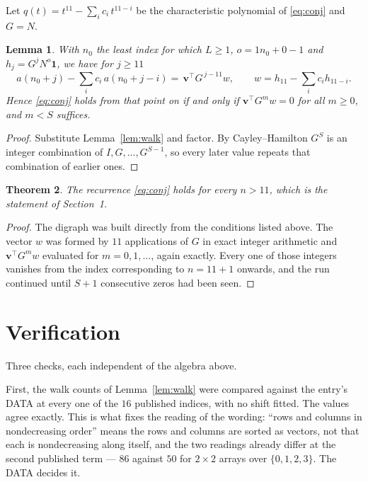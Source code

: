 \documentclass[11pt,a4paper]{article}
\theoremstyle{plain}
\newtheorem{theorem}{Theorem}
\newtheorem{lemma}[theorem]{Lemma}
\theoremstyle{definition}
\begin{document}
Let $q(t)=t^{11}-\sum_i c_i\,t^{11-i}$ be the characteristic polynomial of
\eqref{eq:conj} and $G=N$.

\begin{lemma}\label{lem:crit}
With $n_0$ the least index for which $L\ge1$, $o=1n_0+0-1$ and
$h_j=G^{j}N^{o}\mathbf{1}$, we have for $j\ge11$
\[
a(n_0+j)-\sum_i c_i\,a(n_0+j-i)=\,\mathbf{v}^{\!\top}G^{\,j-11}w,
\qquad w=h_{11}-\sum_i c_ih_{11-i} .
\]
Hence \eqref{eq:conj} holds from that point on if and only if
$\mathbf{v}^{\!\top}G^{m}w=0$ for all $m\ge0$, and $m<S$ suffices.
\end{lemma}

\begin{proof}
Substitute Lemma~\ref{lem:walk} and factor. By Cayley--Hamilton $G^{S}$ is an integer
combination of $I,G,\dots,G^{S-1}$, so every later value repeats that combination of
earlier ones.
\end{proof}

\begin{theorem}
The recurrence \eqref{eq:conj} holds for every $n>11$, which is the statement of
Section~1.
\end{theorem}

\begin{proof}
The digraph was built directly from the conditions listed above. The vector $w$ was formed by
$11$ applications of $G$ in exact integer arithmetic and $\mathbf{v}^{\!\top}G^{m}w$
evaluated for $m=0,1,\dots$, again exactly. Every one of those integers vanishes from the
index corresponding to $n=11+1$ onwards, and the run continued until $S+1$ consecutive
zeros had been seen.
\end{proof}

\section{Verification}

Three checks, each independent of the algebra above.

First, the walk counts of Lemma~\ref{lem:walk} were compared against the entry's DATA at
every one of the $16$ published indices, with no shift fitted. The values agree exactly.
This is what fixes the reading of the wording: ``rows and columns in nondecreasing order''
means the rows and columns are sorted as vectors, not that each is nondecreasing along
itself, and the two readings already differ at the second published term --- $86$ against
$50$ for $2\times2$ arrays over $\{0,1,2,3\}$. The DATA decides it.
\end{document}
